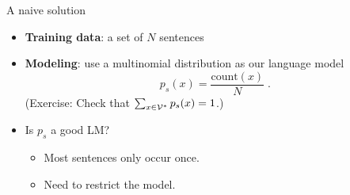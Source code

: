 \documentclass[usenames,dvipsnames,notes,11pt,aspectratio=169,hyperref={colorlinks=true, linkcolor=blue}]{beamer}
\newcommand{\pdfnote}[1]{}
\begin{document}
\begin{frame}
    {A naive solution}
    \begin{itemize}[<+->]
        \itemsep1em
        \item \textbf{Training data}: a set of $N$ sentences %
        \item \textbf{Modeling}: use a multinomial distribution as our language model 
            $$
            p_s(x) = \frac{\text{count}(x)}{N} \;.
            $$
            (Exercise: Check that $\sum_{x\in\mathcal{V}^*}p_s(x) = 1$.)
        \item Is $p_s$ a good LM?\pause
            \begin{itemize}
                \item Most sentences only occur once. \hspace{2cm}
                \item Need to restrict the model. 
            \end{itemize}
    \end{itemize}
    \pdfnote{
        Let's consider a multinomial distribution over the sentences,
        where each sentence is an event, and we estimate the probability of each sentence by its fraction in the corpus.
        Specifically, the count of its occurence divided by the total number of sentences.
    }
    \pdfnote{
        This says that our model is too flexible. The number of parameters are the total number of sentences, which increases exponentially with the vocab size. It can approximate any distribution but we won't be able to estimate the model with limited data.
    }
\end{frame}
\end{document}
